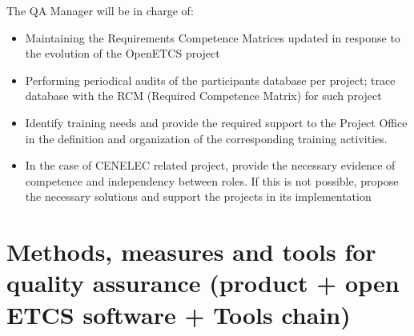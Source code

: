 \documentclass{template/openetcs_article}
\begin{document}
The QA Manager will be in charge of:
\begin{itemize}
\item Maintaining the Requirements Competence Matrices updated in response to the evolution of the OpenETCS project
\item Performing periodical audits of the participants{\textquotesingle} database per project; trace database with the RCM (Required Competence Matrix) for such project
\item Identify training needs and provide the required support to the Project Office in the definition and organization of the corresponding training activities.
\item In the case of CENELEC related project, provide the necessary evidence of competence and independency between roles. If this is not possible, propose the necessary solutions and support the projects in its implementation
\end{itemize}

\section{Methods, measures and tools for quality assurance (product + open ETCS software + Tools chain)}




\end{document}
